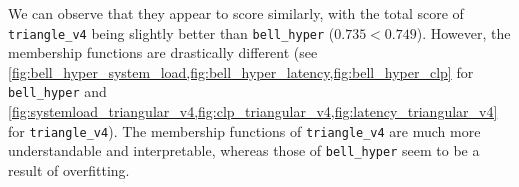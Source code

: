 \documentclass[titlepage]{article}
\begin{document}
We can observe that they appear to score similarly, with the total score of \texttt{triangle\_v4} being slightly better than \texttt{bell\_hyper} ($0.735 < 0.749$).
However, the membership functions are drastically different (see \cref{fig:bell_hyper_system_load,fig:bell_hyper_latency,fig:bell_hyper_clp} for \texttt{bell\_hyper} and \cref{fig:systemload_triangular_v4,fig:clp_triangular_v4,fig:latency_triangular_v4} for \texttt{triangle\_v4}).
The membership functions of \texttt{triangle\_v4} are much more understandable and interpretable, whereas those of \texttt{bell\_hyper} seem to be a result of overfitting.

\end{document}

